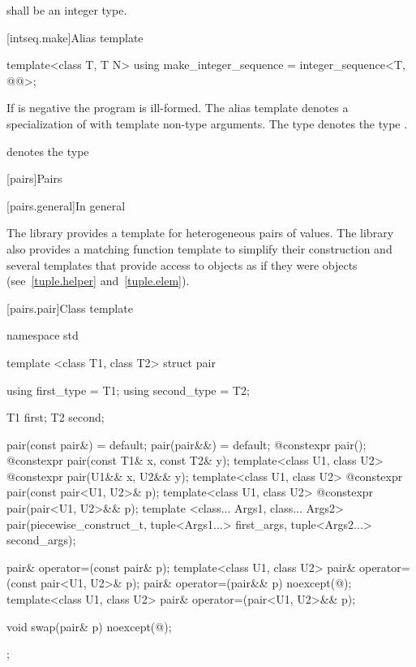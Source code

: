 \pnum
{} shall be an integer type.

[intseq.make]{Alias template }

%
\begin{itemdecl}
template<class T, T N>
  using make_integer_sequence = integer_sequence<T, @\seebelow{}@>;
\end{itemdecl}

\begin{itemdescr}
\pnum
If  is negative the program is ill-formed. The alias template
 denotes a specialization of
 with  template non-type arguments.
The type  denotes the type
.
\begin{note}  denotes the type
 \end{note}
\end{itemdescr}

[pairs]{Pairs}

[pairs.general]{In general}

\pnum
The library provides a template for heterogeneous pairs of values.
The library also provides a matching function template to simplify
their construction and several templates that provide access to 
objects as if they were  objects (see~\ref{tuple.helper}
and~\ref{tuple.elem}).%
%
%
%

[pairs.pair]{Class template }

%
\begin{codeblock}
namespace std {
  template <class T1, class T2>
    struct pair {
      using first_type  = T1;
      using second_type = T2;

      T1 first;
      T2 second;

      pair(const pair&) = default;
      pair(pair&&) = default;
      @\EXPLICIT@ constexpr pair();
      @\EXPLICIT@ constexpr pair(const T1& x, const T2& y);
      template<class U1, class U2> @\EXPLICIT@ constexpr pair(U1&& x, U2&& y);
      template<class U1, class U2> @\EXPLICIT@ constexpr pair(const pair<U1, U2>& p);
      template<class U1, class U2> @\EXPLICIT@ constexpr pair(pair<U1, U2>&& p);
      template <class... Args1, class... Args2>
        pair(piecewise_construct_t, tuple<Args1...> first_args, tuple<Args2...> second_args);

      pair& operator=(const pair& p);
      template<class U1, class U2> pair& operator=(const pair<U1, U2>& p);
      pair& operator=(pair&& p) noexcept(@\seebelow@);
      template<class U1, class U2> pair& operator=(pair<U1, U2>&& p);

      void swap(pair& p) noexcept(@\seebelow@);
    };
}
\end{codeblock}

